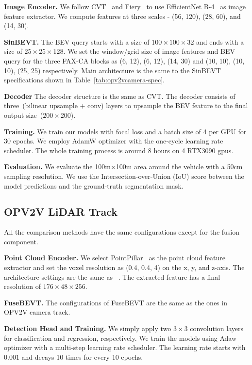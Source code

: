 \documentclass{article}
\begin{document}
\noindent \textbf{Image Encoder.} We follow CVT~\cite{zhou2022cross} and Fiery~\cite{hu2021fiery} to use EfficientNet B-4~\cite{tan2021efficientnetv2} as image feature extractor. We compute features at three scales - (56, 120), (28, 60), and (14, 30).

\noindent \textbf{SinBEVT.} The BEV query starts with a size of $100\times100\times32$ and ends with a size of $25\times 25 \times 128$. We set the window/grid size of image features and BEV query for the three FAX-CA blocks as (6, 12), (6, 12), (14, 30) and (10, 10), (10, 10), (25, 25) respectively. Main architecture is the same to the SinBEVT specifications shown in Table~\ref{tab:opv2vcamera-spec}.

{
\noindent \textbf{Decoder} The decoder structure is the same as CVT. The decoder consists of three~(bilinear upsample + conv) layers to upsample the BEV feature to the final output size~($200\times200$).

\noindent \textbf{Training.}  We train our models with focal loss and a batch size of 4 per GPU for 30 epochs. We employ  AdamW optimizer with the one-cycle learning rate scheduler. The whole training process is around 8 hours on 4 RTX3090 gpus.

\noindent \textbf{Evaluation.} We evaluate the 100m×100m area around the vehicle with a 50cm sampling resolution. We use the Intersection-over-Union (IoU) score between the model predictions and the ground-truth segmentation mask.
}
\subsection{OPV2V LiDAR Track}
All the comparison methods have the same configurations except for the fusion component.

\noindent \textbf{Point Cloud Encoder.} We select PointPillar~\cite{lang2019pointpillars} as the point cloud feature extractor and set the voxel resolution as (0.4, 0.4, 4) on the x, y, and z-axis. The architecture settings are the same as ~\cite{lang2019pointpillars}. The extracted feature has a final resolution of $176 \times 48 \times 256$.

\noindent \textbf{FuseBEVT.} The configurations of FuseBEVT are the same as the ones in OPV2V camera track.

\noindent \textbf{Detection Head and Training.} We simply apply two $3\times3$ convolution layers for classification and regression, respectively. We train the models using Adaw~\cite{loshchilov2017decoupled} optimizer with a multi-step learning rate scheduler. The learning rate starts with $0.001$ and decays 10 times for every 10 epochs.
\end{document}
